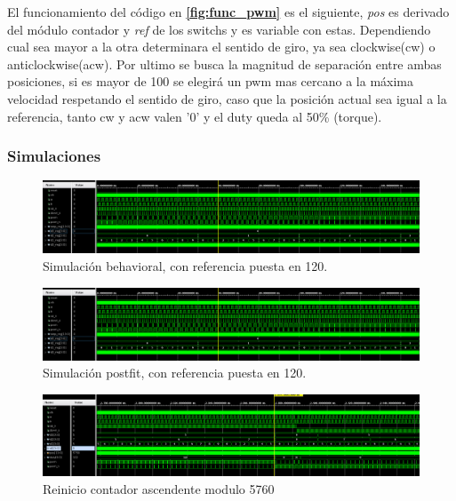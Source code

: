 \documentclass[11pt, a4paper]{article}
\begin{document}
		El funcionamiento del código en  \textcolor{blue}{\textbf{\ref{fig:func_pwm}}} es el siguiente, \textit{pos} es derivado del módulo contador y \textit{ref} de los switchs y es variable con estas. Dependiendo cual sea mayor a la otra determinara el sentido de giro, ya sea clockwise(cw) o anticlockwise(acw). Por ultimo se busca la magnitud de separación entre ambas posiciones, si es mayor de 100 se elegirá un pwm mas cercano a la máxima velocidad respetando el sentido de giro, caso que la posición actual sea igual a la referencia, tanto cw y acw valen '0' y el duty queda al 50\% (torque).

		\subsubsection{Simulaciones}
		\begin{figure}[H]
			\centering
			\includegraphics[width=\textwidth]{Imagenes/sim_impl_120.png}
			\caption{Simulación behavioral, con referencia puesta en 120.}
			\label{fig:sim_behav_pwm}
		\end{figure} 

		\begin{figure}[H]
			\centering
			\includegraphics[width=\textwidth]{Imagenes/sim_impl_120.png}
			\caption{Simulación postfit, con referencia puesta en 120.}
			\label{fig:sim_impl_pwm}
		\end{figure} 
		
		\begin{figure}[H]
			\centering
			\includegraphics[width=\textwidth]{Imagenes/sim_up.png}
			\caption{Reinicio contador ascendente modulo 5760}
			\label{fig:cont_up}
		\end{figure} 
		
\end{document}
